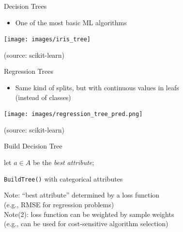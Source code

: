 \begin{frame}[c]{Decision Trees}

\begin{itemize}
  \item One of the most basic ML algorithms
\end{itemize}

\centering
\texttt{[image: images/iris\_tree]}

(source: scikit-learn)
\end{frame}
\begin{frame}[c]{Regression Trees}

\begin{itemize}
  \item Same kind of splits, but with continuous values in leafs\\ (instead of classes)
\end{itemize}

\centering
\texttt{[image: images/regression\_tree\_pred.png]}

(source: scikit-learn)
\end{frame}
\begin{frame}[c]{Build Decision Tree}

\begin{algorithm}[H]
\BlankLine
{} {
}
\pause
{}
\pause
let $a \in A$ be the \emph{best attribute};\\ 
	
\caption{\texttt{BuildTree()} with categorical attributes}
\end{algorithm}

\footnotesize
\pause
Note: ``best attribute'' determined by a loss function\\ (e.g., RMSE for regression problems)\\
\pause
Note(2): loss function can be weighted by sample weights\\ (e.g., can be used for cost-sensitive algorithm selection)

\end{frame}
